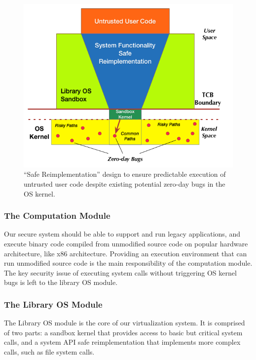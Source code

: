 {\begin{figure}%
\centering
\includegraphics[width=1.0\columnwidth]{diagram/Virtualization_Design_Model_01.png}
\caption{\small ``Safe Reimplementation'' design to ensure predictable execution of untrusted user code
despite existing potential zero-day bugs in the OS kernel.}
\label{fig:design_safe_reimplementation}
\end{figure}


\subsubsection{The Computation Module}

Our secure system should be able to support and run legacy applications,
and execute binary code compiled from unmodified source code on popular hardware architecture,
like x86 architecture. Providing an execution environment that can run unmodified source code is
the main responsibility of the computation module. The key security issue of executing system calls
without triggering OS kernel bugs is left to the library OS module.

\subsubsection{The Library OS Module}

The Library OS module is the core of our virtualization system. It is comprised
of two parts: a sandbox kernel that provides access to basic but critical
system calls, and a system API safe reimplementation that implements more
complex calls, such as file system calls.

}
